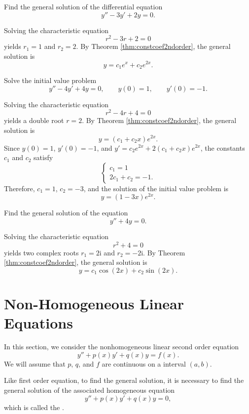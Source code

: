 \begin{exercise}
  Find the general solution of the differential equation
  \[y''- 3y' + 2y=0.\]
\end{exercise}
\begin{exersol}
  Solving the characteristic equation
  \[r^2-3r+2=0\]
  yields $r_1=1$ and $r_2=2$.
  By Theorem \ref{thm:constcoef2ndorder}, the general solution is
  \[y=c_1e^x+c_2e^{2x}.\] 
\end{exersol}

\begin{exercise}
  Solve the initial value problem
  \[y''- 4y' + 4y=0, \qquad y(0)=1,\qquad y'(0)=-1.\]
\end{exercise}
\begin{exersol}
  Solving the characteristic equation
  \[r^2-4r+4=0\]
  yields a double root $r=2$.
  By Theorem \ref{thm:constcoef2ndorder}, the general solution is
  \[y=(c_1+c_2x)e^{2x}.\]
  Since $y(0)=1$, $y'(0)=-1$, and $y'=c_2e^{2x}+2(c_1+c_2x)e^{2x}$, the constants $c_1$ and $c_2$ satisfy
  \[
  \begin{cases}
    c_1=1\\
    2c_1+c_2=-1.
  \end{cases}  
  \]
  Therefore, $c_1=1$, $c_2=-3$, and the solution of the initial value problem is
  \[y=(1-3x)e^{2x}.\]
\end{exersol}

\begin{exercise}
  Find the general solution of the equation
  \[y'' + 4y=0.\]
\end{exercise}
\begin{exersol}
  Solving the characteristic equation
  \[r^2+4=0\]
  yields two complex roots $r_1=2\mathrm{i}$ and $r_2=-2\mathrm{i}$.
  By Theorem \ref{thm:constcoef2ndorder}, the general solution is
  \[y=c_1\cos(2x)+c_2\sin(2x).\]
\end{exersol}

\section{Non-Homogeneous Linear Equations}

In this section, we consider the nonhomogeneous linear second order equation
\[y''+p(x)y'+q(x)y=f(x).\]
We will assume that $p$, $q$, and $f$ are continuous on a interval $(a, b)$.

Like first order equation, to find the general solution, it is necessary to find the general solution of the associated homogeneous equation
\[y''+p(x)y'+q(x)y=0,\]
which is called the .

